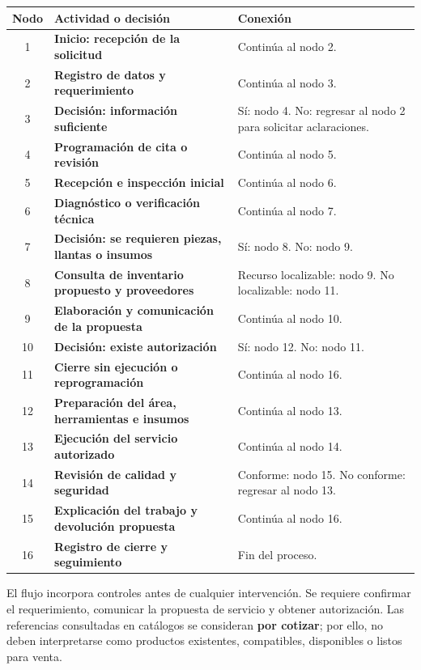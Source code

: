 \documentclass[12pt,letterpaper,oneside]{article}
\begin{document}
\begin{tabularx}{\textwidth}{|c|X|X|}
\hline
\textbf{Nodo} & \textbf{Actividad o decisión} & \textbf{Conexión} \\
\hline
1 & \textbf{Inicio: recepción de la solicitud} & Continúa al nodo 2. \\
\hline
2 & \textbf{Registro de datos y requerimiento} & Continúa al nodo 3. \\
\hline
3 & \textbf{Decisión: información suficiente} & Sí: nodo 4. No: regresar al nodo 2 para solicitar aclaraciones. \\
\hline
4 & \textbf{Programación de cita o revisión} & Continúa al nodo 5. \\
\hline
5 & \textbf{Recepción e inspección inicial} & Continúa al nodo 6. \\
\hline
6 & \textbf{Diagnóstico o verificación técnica} & Continúa al nodo 7. \\
\hline
7 & \textbf{Decisión: se requieren piezas, llantas o insumos} & Sí: nodo 8. No: nodo 9. \\
\hline
8 & \textbf{Consulta de inventario propuesto y proveedores} & Recurso localizable: nodo 9. No localizable: nodo 11. \\
\hline
9 & \textbf{Elaboración y comunicación de la propuesta} & Continúa al nodo 10. \\
\hline
10 & \textbf{Decisión: existe autorización} & Sí: nodo 12. No: nodo 11. \\
\hline
11 & \textbf{Cierre sin ejecución o reprogramación} & Continúa al nodo 16. \\
\hline
12 & \textbf{Preparación del área, herramientas e insumos} & Continúa al nodo 13. \\
\hline
13 & \textbf{Ejecución del servicio autorizado} & Continúa al nodo 14. \\
\hline
14 & \textbf{Revisión de calidad y seguridad} & Conforme: nodo 15. No conforme: regresar al nodo 13. \\
\hline
15 & \textbf{Explicación del trabajo y devolución propuesta} & Continúa al nodo 16. \\
\hline
16 & \textbf{Registro de cierre y seguimiento} & Fin del proceso. \\
\hline
\end{tabularx}

El flujo incorpora controles antes de cualquier intervención. Se requiere confirmar el requerimiento, comunicar la propuesta de servicio y obtener autorización. Las referencias consultadas en catálogos se consideran \textbf{por cotizar}; por ello, no deben interpretarse como productos existentes, compatibles, disponibles o listos para venta.
\end{document}
